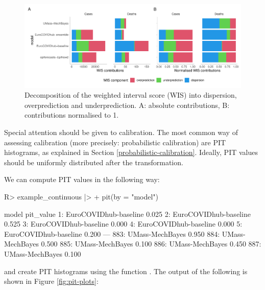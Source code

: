 \documentclass[
]{jss}
\begin{document}
\begin{CodeChunk}
\begin{figure}[!h]

{\centering \includegraphics[width=1\linewidth]{manuscript_files/figure-latex/wis-components-1}

}

\caption[Decomposition of the weighted interval score (WIS) into dispersion, overprediction and underprediction]{Decomposition of the weighted interval score (WIS) into dispersion, overprediction and underprediction. A: absolute contributions, B: contributions normalised to 1.}\label{fig:wis-components}
\end{figure}
\end{CodeChunk}

Special attention should be given to calibration. The most common way of
assessing calibration (more precisely: probabilistic calibration) are
PIT histograms, as explained in Section \ref{probabilistic-calibration}.
Ideally, PIT values should be uniformly distributed after the
transformation.

We can compute PIT values in the following way:

\begin{CodeChunk}
\begin{CodeInput}
R> example_continuous |>
+   pit(by = "model")
\end{CodeInput}
\begin{CodeOutput}
                     model pit_value
  1: EuroCOVIDhub-baseline     0.025
  2: EuroCOVIDhub-baseline     0.525
  3: EuroCOVIDhub-baseline     0.000
  4: EuroCOVIDhub-baseline     0.000
  5: EuroCOVIDhub-baseline     0.200
 ---
883:       UMass-MechBayes     0.950
884:       UMass-MechBayes     0.500
885:       UMass-MechBayes     0.100
886:       UMass-MechBayes     0.450
887:       UMass-MechBayes     0.100
\end{CodeOutput}
\end{CodeChunk}

and create PIT histograms using the function . The
output of the following is shown in Figure \ref{fig:pit-plots}:
\end{document}
